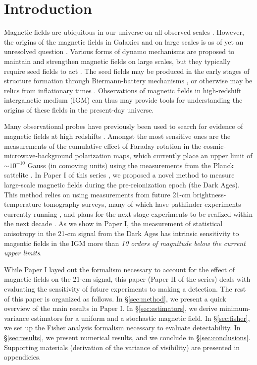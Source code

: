 \section{Introduction}
\label{sec:intro}

Magnetic fields are ubiquitous in our universe on all observed scales \cite{}. However, the origins of the magnetic fields in Galaxies and on large scales is as of yet an unresolved question \cite{}. Various forms of dynamo mechanisms are proposed to maintain and strengthen magnetic fields \cite{} on large scales, but they typically require seed fields to act \cite{}. The seed fields may be produced in the early stages of structure formation \cite{} through Biermann-battery mechanisms \cite{}, or otherwise may be relics from inflationary times \cite{}. Observations of magnetic fields in high-redshift intergalactic medium (IGM) can thus may provide tools for understanding the origins of these fields in the present-day universe.

Many observational probes have previously been used to search for evidence of magnetic fields at high redshifts \cite{}. Amongst the most sensitive ones are the measurements of the cumulative effect of Faraday rotation in the cosmic-microwave-background polarization maps, which currently place an upper limit of $\sim$$10^{-10}$ Gauss (in comoving units) using the measurements from the Planck sattelite \cite{}. In Paper I of this series \cite{}, we proposed a novel method to measure large-scale magnetic fields during the pre-reionization epoch (the Dark Ages). This method relies on using measurements from future 21-cm brightness-temperature tomography surveys, many of which have pathfinder experiments currently running \cite{}, and plans for the next stage experiments to be realized within the next decade \cite{}. As we show in Paper I, the measurement of statistical anisotropy in the 21-cm signal from the Dark Ages has intrinsic sensitivity to magentic fields in the IGM more than \textit{10 orders of magnitude below the current upper limits}. 

While Paper I layed out the formalism necessary to account for the effect of  magnetic fields on the 21-cm signal, this paper (Paper II of the series) deals with evaluating the sensitivity of future experiments to making a detection. The rest of this paper is organized as follows. In \S\ref{sec:method}, we present a quick overview of the main results in Paper I. In \S\ref{sec:estimators}, we derive minimum-variance estimators for a uniform and a stochastic magnetic field. In \S\ref{sec:fisher}, we set up the Fisher analysis formalism necessary to evaluate detectability. In \S\ref{sec:results}, we present numerical results, and we conclude in \S\ref{sec:conclusions}. Supporting materials (derivation of the variance of visibility) are presented in appendicies.

